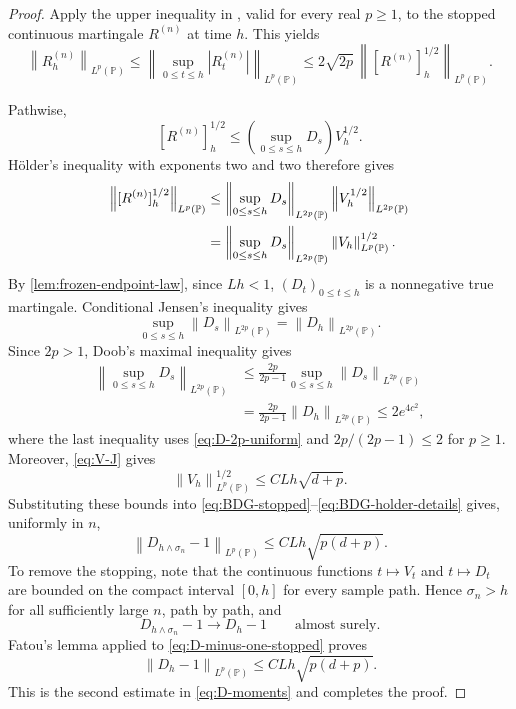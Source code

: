 \documentclass[11pt]{article}
\newcommand{\norm}[1]{\left\lVert #1\right\rVert}
\newcommand{\abs}[1]{\left\lvert #1\right\rvert}
\newcommand{\1}{\mathbf 1}
\begin{document}
\begin{proof}
		Apply the upper inequality in
		\citet[Theorem~2, equation~(23)]{Ren2008}, valid for every real \(p\geq1\),
		to the stopped continuous martingale \(R^{(n)}\) at time \(h\).
		This yields
		\begin{equation}\label{eq:BDG-stopped}
			\norm{R_h^{(n)}}_{L^p(\mathbb P)}
			\leq
			\norm{\sup_{0\leq t\leq h}\abs{R_t^{(n)}}}_{L^p(\mathbb P)}
			\leq
			2\sqrt{2p}\,
			\norm{[R^{(n)}]_h^{1/2}}_{L^p(\mathbb P)}.
		\end{equation}
		
		Pathwise,
		\[
		[R^{(n)}]_h^{1/2}
		\leq
		\left(\sup_{0\leq s\leq h}D_s\right)V_h^{1/2}.
		\]
		H\"older's inequality with exponents two and two therefore gives
		\begin{align}
			\norm{[R^{(n)}]_h^{1/2}}_{L^p(\mathbb P)}
			&\leq
			\norm{\sup_{0\leq s\leq h}D_s}_{L^{2p}(\mathbb P)}
			\norm{V_h^{1/2}}_{L^{2p}(\mathbb P)}
			\notag\\
			&=
			\norm{\sup_{0\leq s\leq h}D_s}_{L^{2p}(\mathbb P)}
			\norm{V_h}_{L^p(\mathbb P)}^{1/2}.
			\label{eq:BDG-holder-details}
		\end{align}
		By \cref{lem:frozen-endpoint-law}, since $Lh < 1$, \((D_t)_{0 \leq t \leq h}\) is a nonnegative true
		martingale. 
		Conditional Jensen's inequality gives
		\[
		\sup_{0\leq s\leq h}\norm{D_s}_{L^{2p}(\mathbb P)}
		=\norm{D_h}_{L^{2p}(\mathbb P)}.
		\]
		Since \(2p > 1\), Doob's maximal inequality
		\citep[Chapter~II, Theorem~1.7]{RevuzYor1999} gives
		\begin{align*}
			\norm{\sup_{0\leq s\leq h}D_s}_{L^{2p}(\mathbb P)}
			&\leq\frac{2p}{2p-1}
			\sup_{0\leq s\leq h}\norm{D_s}_{L^{2p}(\mathbb P)}\\
			&=\frac{2p}{2p-1}\norm{D_h}_{L^{2p}(\mathbb P)}
			\leq2e^{4c^2},
		\end{align*}
		where the last inequality uses \eqref{eq:D-2p-uniform} and
		\(2p/(2p-1)\leq2\) for \(p\geq1\). Moreover,
		\eqref{eq:V-J} gives
		\[
		\norm{V_h}_{L^p(\mathbb P)}^{1/2}
		\leq CLh\sqrt{d+p}.
		\]
		Substituting these bounds into
		\eqref{eq:BDG-stopped}--\eqref{eq:BDG-holder-details} gives, uniformly in
		\(n\),
		\begin{equation}\label{eq:D-minus-one-stopped}
			\norm{D_{h\wedge\sigma_n}-1}_{L^p(\mathbb P)}
			\leq CLh\sqrt{p(d+p)}.
		\end{equation}
		To remove the stopping, note that the continuous functions
		\(t\mapsto V_t\) and \(t\mapsto D_t\) are bounded on the compact interval
		\([0,h]\) for every sample path. Hence \(\sigma_n>h\) for all sufficiently
		large \(n\), path by path, and
		\[
		D_{h\wedge\sigma_n}-1\longrightarrow D_h-1
		\qquad\text{almost surely}.
		\]
		Fatou's lemma applied to \eqref{eq:D-minus-one-stopped} proves
		\[
		\norm{D_h-1}_{L^p(\mathbb P)}
		\leq CLh\sqrt{p(d+p)}.
		\]
		This is the second estimate in \eqref{eq:D-moments} and completes the proof.
	\end{proof}
	
\end{document}
